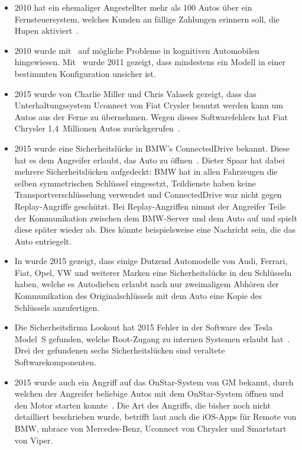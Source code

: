 \begin{itemize}
    \item 2010 hat ein ehemaliger Angestellter mehr als 100 Autos über ein
Fernsteuersystem, welches Kunden an fällige Zahlungen erinnern soll, die Hupen
aktiviert~\cite{Poulsen2010}.
    \item 2010 wurde mit~\cite{Koscher2010} auf mögliche Probleme in kognitiven
Automobilen hingewiesen. Mit~\cite{Checkoway2011} wurde 2011 gezeigt, dass
mindestens ein Modell in einer bestimmten Konfiguration unsicher ist.
    \item  2015
wurde von Charlie Miller und Chris Valasek gezeigt, dass das
Unterhaltungssystem Uconnect von Fiat Crysler benutzt werden kann um Autos aus
der Ferne zu übernehmen. Wegen dieses Softwarefehlers hat Fiat Chrysler
1,4~Millionen Autos zurückgerufen~\cite{Gallagher2015}.
    \item 2015 wurde eine Sicherheitslücke in BMW's ConnectedDrive bekannt. Diese hat
es dem Angreifer erlaubt, das Auto zu öffnen~\cite{Spaar2015}. Dieter Spaar
hat dabei mehrere Sicherheitslücken aufgedeckt: BMW hat in allen Fahrzeugen
die selben symmetrischen Schlüssel eingesetzt, Teildienste haben keine
Transportverschlüsselung verwendet und ConnectedDrive war nicht gegen
Replay-Angriffe geschützt. Bei Replay-Angriffen nimmt der Angreifer Teile der
Kommunikation zwischen dem BMW-Server und dem Auto auf und spielt diese
später wieder ab. Dies könnte beispielsweise eine Nachricht sein, die das
Auto entriegelt.
    \item In \cite{Verdult2015} wurde 2015 gezeigt, dass einige Dutzend Automodelle von
Audi, Ferrari, Fiat, Opel, VW und weiterer Marken eine Sicherheitslücke in den
Schlüsseln haben, welche es Autodieben erlaubt nach nur zweimaligem Abhören der
Kommunikation des Originalschlüssels mit dem Auto eine Kopie des Schlüssels
anzufertigen.
    \item Die Sicherheitsfirma Lookout hat 2015 Fehler in der Software des Tesla Model~S
gefunden, welche Root-Zugang zu internen Systemen erlaubt hat~\cite{Mahaffey2015}.
Drei der gefundenen sechs Sicherheitslücken sind veraltete Softwarekomponenten.
    \item 2015 wurde auch ein Angriff auf das OnStar-System von GM bekannt, durch welchen
der Angreifer beliebige Autos mit dem OnStar-System öffnen und den Motor
starten konnte~\cite{Stevens2015}. Die Art des Angriffs, die bisher noch nicht
detailliert beschrieben wurde, betrifft laut \cite{Greenberg2015} auch die
iOS-Apps für Remote von BMW, mbrace von Mercedes-Benz, Uconnect von Chrysler
und Smartstart von Viper.
\end{itemize}
